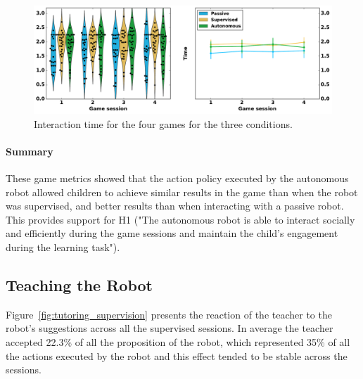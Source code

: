 \begin{figure}[ht]
	\includegraphics[width=1\linewidth]{time.pdf}
	\centering
	\caption{Interaction time for the four games for the three conditions.}
	\label{fig:tutoring_time}
\end{figure}


\paragraph{Summary}

These game metrics showed that the action policy executed by the autonomous robot allowed children to achieve similar results in the game than when the robot was supervised, and better results than when interacting with a passive robot. This provides support for H1 ("The autonomous robot is able to interact socially and efficiently during the game sessions and maintain the child's engagement during the learning task"). 

\subsection{Teaching the Robot}
Figure~\ref{fig:tutoring_supervision} presents the reaction of the teacher to the robot's suggestions across all the supervised sessions. In average the teacher accepted 22.3\% of all the proposition of the robot, which represented 35\% of all the actions executed by the robot and this effect tended to be stable across the sessions.


